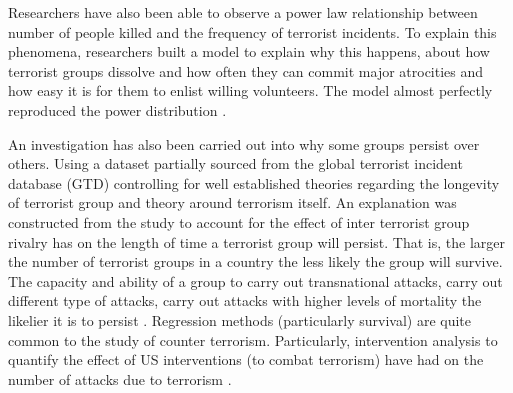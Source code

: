 Researchers have also been able to observe a power law relationship between number of people killed and the frequency of terrorist incidents. To explain this phenomena, researchers built a model to explain why this happens, about how terrorist groups dissolve and how often they can commit major atrocities and how easy it is for them to enlist willing volunteers. The model almost perfectly reproduced the power distribution \citep{clauset2005scale}.

An investigation has also been carried out into why some groups persist over others. Using a dataset partially sourced from the global terrorist incident database (GTD) controlling for well established theories regarding the longevity of terrorist group and theory around terrorism itself. An explanation was constructed from the study to account for the effect of inter terrorist group rivalry has on the length of time a terrorist group will persist. That is, the larger the number of terrorist groups in a country the less likely the group will survive. The capacity and ability of a group to carry out transnational attacks, carry out different type of attacks, carry out attacks with higher levels of mortality the likelier it is to persist \citep{young2014survival}. Regression methods (particularly survival) are quite common to the study of counter terrorism. Particularly, intervention analysis to quantify the effect of US interventions (to combat terrorism) have had on the number of attacks due to terrorism \citep{enders1993effectiveness}.

